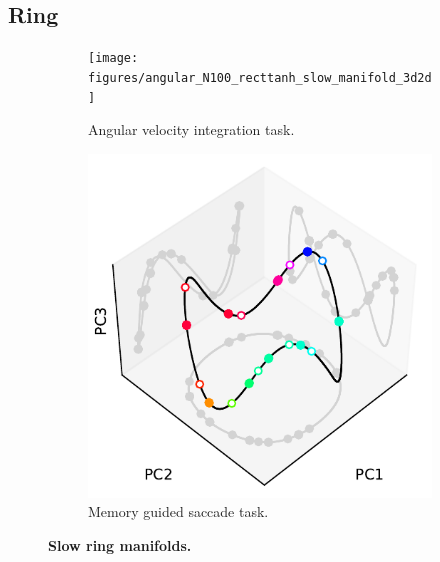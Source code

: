 \documentclass{article}
\newcounter{ct}
\theoremstyle{definition}
\theoremstyle{remark}
\begin{document}
\subsection{Ring}
\begin{figure}[htbp]
    \centering
    \begin{subfigure}[b]{0.45\textwidth}
        \centering
        \texttt{[image: figures/angular\_N100\_recttanh\_slow\_manifold\_3d2d]}
        \caption{Angular velocity integration task.}
        \label{fig:slowangular}
    \end{subfigure}
    \quad
    \begin{subfigure}[b]{0.45\textwidth}
        \centering
            \includegraphics[width=\textwidth]{figures/centerout_N100_tanh_slow_manifold_3d2d.pdf}
        \caption{Memory guided saccade task.}
    \label{fig:slowcenterout}
    \end{subfigure}
    \caption{\textbf{Slow ring manifolds.}}
    \label{fig:slowmanifolds}
\end{figure}
\end{document}
